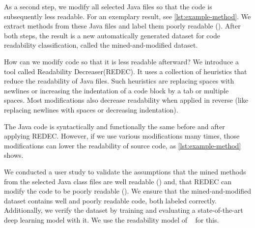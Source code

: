 \documentclass[%
class=scrreprt,
chapterprefix=false,%
open=right,%
twoside=true,%
paper=a4,%
logofile={Logo\_zentral\_farbig\_EN.png},%
thesistype=master,%
UKenglish,%
]{se2thesis}
\theoremstyle{definition}
\newcommand{\RDH}{Readability Decreaser\xspace}
\newcommand{\rdh}{REDEC\xspace}
\newcommand{\RDHa}{\RDH (\rdh)\xspace} %
\begin{document}
	As a second step, we modify all selected Java files so that the code is subsequently less readable. For an exemplary result, see \autoref{lst:example-method}.
	We extract methods from these Java files and label them poorly readable ().
	After both steps, the result is a new automatically generated dataset for code readability classification, called the mined-and-modified dataset.
	
	How can we modify code so that it is less readable afterward? We introduce a tool called \RDHa. It uses a collection of heuristics that reduce the readability of Java files. Such heuristics are replacing spaces with newlines or increasing the indentation of a code block by a tab or multiple spaces. Most modifications also decrease readability when applied in reverse (like replacing newlines with spaces or decreasing indentation).
	
	The Java code is syntactically and functionally the same before and after applying \rdh. However, if we use various modifications many times, those modifications can lower the readability of source code, as \autoref{lst:example-method} shows.

	We conducted a user study to validate the assumptions that the mined methods from the selected Java class files are well readable () and, that \rdh can modify the code to be poorly readable ().
	We ensure that the mined-and-modified dataset contains well and poorly readable code, both labeled correctly.
	Additionally, we verify the dataset by training and evaluating a state-of-the-art deep learning model with it. We use the readability model of \citeauthor{mi2022towards}~\cite{mi2022towards} for this.
		
\end{document}
